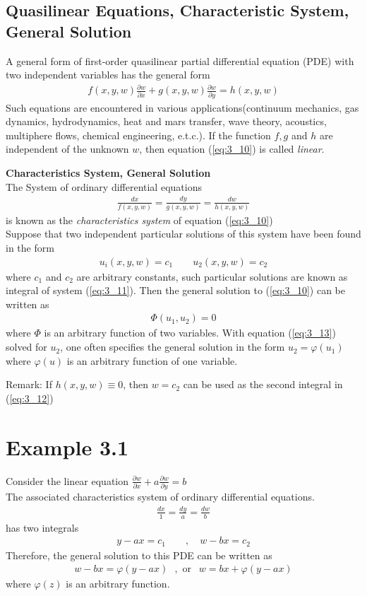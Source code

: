 \documentclass[11pt]{report}
\newcommand{\NI}{\noindent}
\newcommand{\sps}{\\[0.2cm]}
\newcommand{\refn}[1]{(\ref{#1})}
\newcommand{\refx}[1]{\refn{eq:#1}}
\newcommand{\bt}[1]{\textbf{#1}}
\newcommand{\dsp}{\displaystyle}
\begin{document}
	\subsection{Quasilinear Equations, Characteristic System, General Solution} 
	A general form of first-order quasilinear partial differential equation (PDE) with two independent variables has the general form
	\begin{eqnarray}
		f(x,y,w)\frac{\partial w}{\partial x} + g(x,y,w)\frac{\partial w}{\partial y}= h(x,y,w)\label{eq:3_10}
	\end{eqnarray}
	Such equations are encountered in various applications(continuum mechanics, gas dynamics, hydrodynamics, heat and mars transfer, wave theory, acoustics, multiphere flows, chemical engineering, e.t.c.). If the function $f,g$ and $h$ are independent of the unknown $w$, then equation \refx{3_10} is called \textit{linear}.
	
	\NI\bt{Characteristics System, General Solution}\sps
	The System of ordinary differential equations
	\begin{eqnarray}
		\frac{dx}{f(x,y,w)} = \frac{dy}{g(x,y,w)} = \frac{dw}{h(x,y,w)} \label{eq:3_11}
	\end{eqnarray}
	is known as the \textit{characteristics system} of equation \refx{3_10}\sps
	Suppose that two independent particular solutions of this system have been found in the form
	\begin{eqnarray}
		u_i(x,y,w) =c_1\qquad u_2(x,y,w)=c_2\label{eq:3_12}
	\end{eqnarray}
	where $c_1$ and $c_2$ are arbitrary constants, such particular solutions are known as integral of system \refx{3_11}. Then the general solution to \refx{3_10} can be written as
	\begin{eqnarray}
		\Phi(u_1,u_2) = 0 \label{eq:3_13}
	\end{eqnarray}
	where $\Phi$ is an arbitrary function of two variables. With equation \refx{3_13} solved for $u_2$, one often specifies the general solution in the form $u_2 = \varphi(u_1)$ where $\varphi(u)$ is an arbitrary function of one variable.
	
	\NI Remark: If $h(x,y,w)\equiv 0$, then $w=c_2$ can be used as the second integral in \refx{3_12}\sps
	
	\section*{Example 3.1}
	Consider the linear equation $\dsp \frac{\partial w}{\partial x} + a \frac{\partial w}{\partial y} = b$\sps
	The associated characteristics system of ordinary differential equations.
	\begin{eqnarray*}
		\frac{dx}{1} = \frac{dy}{a} = \frac{dw}{b}
	\end{eqnarray*}
	has two integrals
	\begin{eqnarray*}
		y-ax=c_1\qquad , \quad w-bx = c_2
	\end{eqnarray*}
	Therefore, the general solution to this PDE can be written as
	\begin{eqnarray*}
		w-bx=\varphi(y-ax)~~~, \text{ or } ~~ w=bx+\varphi(y-ax)
	\end{eqnarray*}
	where $\varphi(z)$ is an arbitrary function.
	
\end{document}
